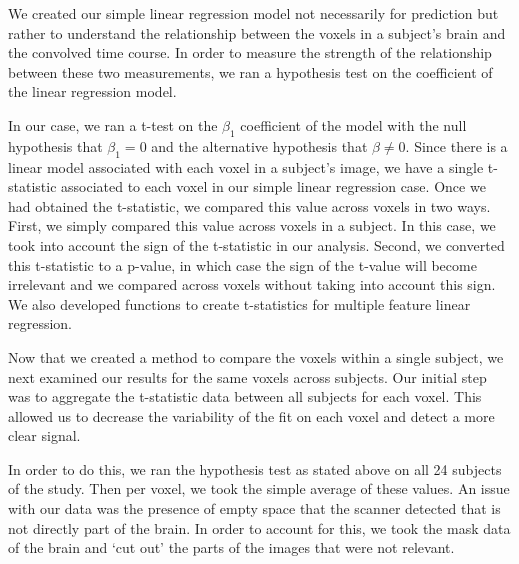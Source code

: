\par \indent We created our simple linear regression model not necessarily for prediction but rather to understand the relationship between the voxels in a subject's brain and the convolved time course. In order to measure the strength of the relationship between these two measurements, we ran a hypothesis test on the coefficient of the linear regression model.
	\par In our case, we ran a t-test on the $\beta_1$ coefficient of the model with the null hypothesis that $\beta_1=0$ and the alternative hypothesis that $\beta \neq 0$. Since there is a linear model associated with each voxel in a subject’s image, we have a single t-statistic associated to each voxel in our simple linear regression case. Once we had obtained the t-statistic, we compared this value across voxels in two ways. First, we simply compared this value across voxels in a subject. In this case, we took into account the sign of the t-statistic in our analysis. Second, we converted this t-statistic to a p-value, in which case the sign of the t-value will become irrelevant and we compared across voxels without taking into account this sign.  We also developed functions to create t-statistics for multiple feature linear regression. 
	\par \indent Now that we created a method to compare the voxels within a single subject, we next examined our results for the same voxels across subjects. Our initial step was to aggregate the t-statistic data between all subjects for each voxel. This allowed us to decrease the variability of the fit on each voxel and detect a more clear signal. 
	\par \indent In order to do this, we ran the hypothesis test as stated above on all 24 subjects of the study. Then per voxel, we took the simple average of these values. An issue with our data was the presence of empty space that the scanner detected that is not directly part of the brain. In order to account for this, we took the mask data of the brain and ‘cut out’ the parts of the images that were not relevant. 
